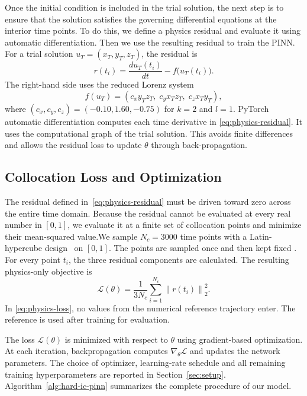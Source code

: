 Once the initial condition is included in the trial solution, the next step is to ensure that the solution satisfies the governing differential equations at the interior time points. To do this, we define a physics residual and evaluate it using automatic differentiation. Then we use the resulting residual to train the PINN. For a trial solution
$u_T=(x_T,y_T,z_T)$, the residual is
\begin{equation}
    r(t_i)=\frac{d u_T(t_i)}{d t}-f\bigl(u_T(t_i)\bigr).
    \label{eq:physics-residual}
\end{equation}
The right-hand side uses the reduced Lorenz system
\begin{equation}
    f(u_T)=
    \left(c_x y_Tz_T,\;c_y x_Tz_T,\;c_z x_Ty_T\right),
    \label{eq:lorenz-rhs}
\end{equation}
where $(c_x,c_y,c_z)=(-0.10,1.60,-0.75)$ for $k=2$ and $l=1$. PyTorch~\cite{paszke2019}
automatic differentiation computes each time derivative in \eqref{eq:physics-residual}.
It uses the computational graph of the trial solution. This avoids finite
differences and allows the residual loss to update $\theta$ through
back-propagation.

\subsection{Collocation Loss and Optimization}

The residual defined in~\eqref{eq:physics-residual} must be driven
toward zero across the entire time domain. Because the residual
cannot be evaluated at every real number in $[0,1]$, we evaluate it
at a finite set of collocation points and minimize their
mean-squared value.We sample $N_c=3000$ time points with a Latin-hypercube design~\cite{mckay1979} on $[0,1]$.
The points are sampled once and then kept fixed . For every point $t_i$, the
three residual components are calculated. The resulting physics-only objective is
\begin{equation}
    \mathcal{L}(\theta)=
    \frac{1}{3N_c}\sum_{i=1}^{N_c}\left\|r(t_i)\right\|_2^2.
    \label{eq:physics-loss}
\end{equation}
In \eqref{eq:physics-loss}, no values from the numerical reference trajectory enter.
The reference is used after training for evaluation.

The loss $\mathcal{L}(\theta)$ is minimized with respect to $\theta$ using gradient-based optimization. At each iteration, backpropagation computes $\nabla_\theta \mathcal{L}$ and updates the network parameters. The choice of optimizer, learning-rate schedule  and all remaining training hyperparameters are reported in Section~\ref{sec:setup}. Algorithm~\ref{alg:hard-ic-pinn} summarizes the complete procedure of our model.





